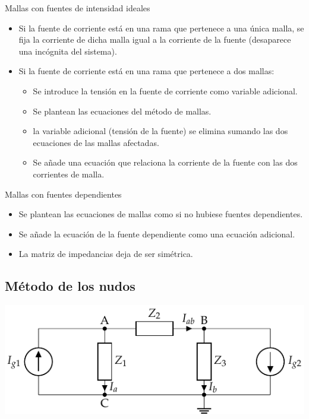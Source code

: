 \documentclass[aspectratio=169, usenames,svgnames,dvipsnames]{beamer}
\begin{document}
\begin{frame}[label={sec:orga8a80a5}]{Mallas con fuentes de intensidad ideales}
\begin{itemize}
\item Si la fuente de corriente está en una rama que pertenece a una única malla, se fija la corriente de dicha malla igual a la corriente de la fuente (desaparece una incógnita del sistema).
\item Si la fuente de corriente está en una rama que pertenece a dos mallas:
\begin{itemize}
\item Se introduce la tensión en la fuente de corriente como variable adicional.
\item Se plantean las ecuaciones del método de mallas.
\item la variable adicional (tensión de la fuente) se elimina sumando las dos ecuaciones de las mallas afectadas.
\item Se añade una ecuación que relaciona la corriente de la fuente con las dos corrientes de malla.
\end{itemize}
\end{itemize}
\end{frame}
\begin{frame}[label={sec:orgd74df02}]{Mallas con fuentes dependientes}
\begin{itemize}
\item Se plantean las ecuaciones de mallas como si no hubiese fuentes dependientes.
\item Se añade la ecuación de la fuente dependiente como una ecuación adicional.
\item La matriz de impedancias deja de ser simétrica.
\end{itemize}
\end{frame}

\subsection{Método de los nudos}
\label{sec:orga4e0062}
\begin{frame}[label={sec:org95229f1}]{}
\begin{center}
\includegraphics[width=.9\linewidth]{../figs/nudosAC.pdf}
\end{center}
\end{frame}
\end{document}
